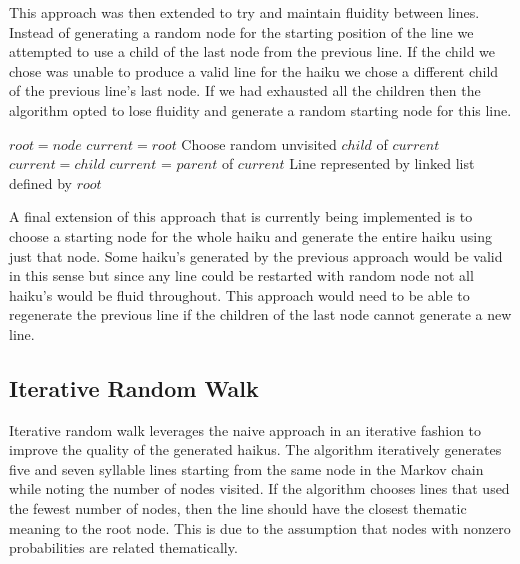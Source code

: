 \documentclass[]{article}
\begin{document}
This approach was then extended to try and maintain fluidity between lines. Instead of generating a random node for the starting position of the line we attempted to use a child of the last node from the previous line. If the child we chose was unable to produce a valid line for the haiku we chose a different child of the previous line's last node. If we had exhausted all the children then the algorithm opted to lose fluidity and generate a random starting node for this line.

\begin{algorithm}[H]
	\caption{$Depth\_First\_Search(node, n)$} \label{DFSB_WithStart}
	\begin{algorithmic}[1]
		\State $root = node$
		\State $current = root$
		\State Choose random unvisited $child$ of $current$
		\State $current = child$
		\EndIf
		\Else
		\Else
		\State $current$ = $parent$ of $current$
		\EndIf
		\EndIf
		\EndWhile
		\Return Line represented by linked list defined by $root$
	\end{algorithmic}
\end{algorithm}

A final extension of this approach that is currently being implemented is to choose a starting node for the whole haiku and generate the entire haiku using just that node. Some haiku's generated by the previous approach would be valid in this sense but since any line could be restarted with random node not all haiku's would be fluid throughout. This approach would need to be able to regenerate the previous line if the children of the last node cannot generate a new line.


\subsection{Iterative Random Walk}

Iterative random walk leverages the naive approach in an iterative fashion to improve the quality of the generated haikus. The algorithm iteratively generates five and seven syllable lines starting from the same node in the Markov chain while noting the number of nodes visited. If the algorithm chooses lines that used the fewest number of nodes, then the line should have the closest thematic meaning to the root node. This is due to the assumption that nodes with nonzero probabilities are related thematically.
\end{document}
